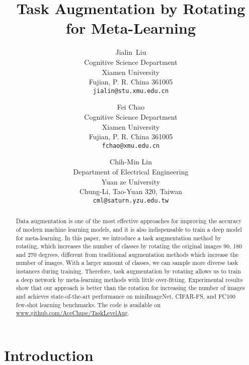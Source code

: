 \documentclass[10pt,twocolumn,letterpaper]{article}
\begin{document}
\title{Task Augmentation by Rotating for Meta-Learning}

\author{Jialin~Liu \\
  Cognitive Science Department\\
  Xiamen University\\
  Fujian, P. R. China 361005 \\
  \texttt{jialin@stu.xmu.edu.cn} \\
\and
   Fei Chao \\
   Cognitive Science Department \\
      Xiamen University \\
   Fujian, P. R. China 361005 \\
   \texttt{fchao@xmu.edu.cn} \\
   \and
   Chih-Min Lin\\
    Department of Electrical Engineering\\
   Yuan ze University \\
   Chung-Li, Tao-Yuan 320, Taiwan\\
      \texttt{cml@saturn.yzu.edu.tw} \\
}

\maketitle


\begin{abstract}
  Data augmentation is one of the most effective approaches for improving the accuracy of modern machine learning models, and it is also indispensable to train a deep model for meta-learning. In this paper, we introduce a task augmentation method by rotating, which increases the number of classes by rotating the original images 90, 180 and 270 degrees, different from traditional augmentation methods which increase the number of images.
With a larger amount of classes, we can sample more diverse task instances during training. Therefore, task augmentation by rotating allows us to train a deep network by meta-learning methods with little over-fitting. Experimental results show that our approach is better than the rotation for increasing the number of images and achieves state-of-the-art performance on miniImageNet, CIFAR-FS, and FC100 few-shot learning benchmarks. The code is available on \url{www.github.com/AceChuse/TaskLevelAug}.
\end{abstract}

\section{Introduction}
\end{document}
